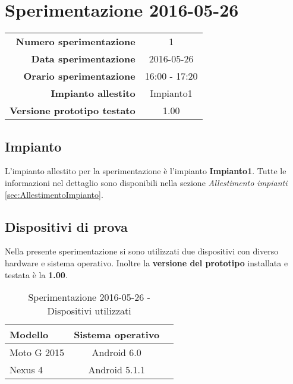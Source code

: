 \documentclass[../Sperimentazione.tex]{subfiles}
\begin{document}
	\section{Sperimentazione 2016-05-26}
	
		\begin{table} [h]
		\centering
		\begin{tabular}[width=0.5\textwidth]{r|c}
			\textbf{Numero sperimentazione} & 1 \\
			\textbf{Data sperimentazione} & 2016-05-26 \\
			\textbf{Orario sperimentazione} & 16:00 - 17:20 \\
			\textbf{Impianto allestito} & Impianto1 \\
			\textbf{Versione prototipo testato} & 1.00 \\		
		\end{tabular}
		\end{table}
	
		
		\subsection{Impianto}
		L'impianto allestito per la sperimentazione è l'impianto \textbf{Impianto1}. Tutte le informazioni nel dettaglio sono disponibili nella sezione \textit{Allestimento impianti} \ref{sec:AllestimentoImpianto}.


		\subsection{Dispositivi di prova}
			Nella presente sperimentazione si sono utilizzati due dispositivi con diverso hardware e sistema operativo. Inoltre la \textbf{versione del prototipo} installata e testata è la \textbf{1.00}.
	
			\begin{table} [h]
			\centering
				\begin{tabular}{lcc}
					\textbf{Modello} & \textbf{Sistema operativo} \\
					\toprule
					Moto G 2015 & Android 6.0 \\
					\midrule
					Nexus 4 & Android 5.1.1 \\
					\bottomrule
				\end{tabular}
				\caption{Sperimentazione 2016-05-26 - Dispositivi utilizzati}
				\label{tab:Sperimentazione1Dispositivi}
			\end{table}
		
\end{document}
